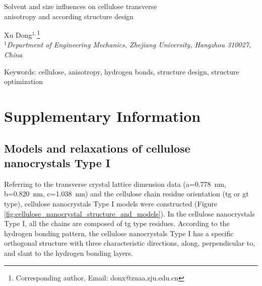 \documentclass{article}
\begin{document}
\begin{center}
\LARGE Solvent and size influences on cellulose transverse\\
anisotropy and according structure design\\
\end{center}

\begin{center}
\renewcommand{\thefootnote}{\fnsymbol{footnote}}
Xu Dong$^{1,}$\footnote{Corresponding author, Email: donx@zuaa.zju.edu.cn}\\
$^{1}$\textit{Department of Engineering Mechanics, Zhejiang University, Hangzhou 310027, China}
\end{center}

\begin{center}
Keywords: cellulose, anisotropy, hydrogen bonds, structure design, structure optimization
\end{center}





\setcounter{section}{0}
\setcounter{subsection}{0}

\setcounter{table}{0}
\setcounter{figure}{0}
\setcounter{equation}{0}

\renewcommand{\thesection}{S\arabic{section}}
\renewcommand{\thesubsection}{S\arabic{subsection}}

\renewcommand{\thetable}{S\arabic{table}}
\renewcommand{\thefigure}{S\arabic{figure}}
\renewcommand{\theequation}{S\arabic{equation}}





\section*{Supplementary Information}
\addtocounter{section}{1}
\setcounter{subsection}{0}
\indent

\subsection*{Models and relaxations of cellulose nanocrystals Type I}\indent
{}\indent

Referring to the transverse crystal lattice dimension data (a=0.778~nm, b=0.820~nm, c=1.038~nm) and the cellulose chain residue orientation (tg or gt type), cellulose nanocrystals Type I models were constructed (Figure \ref{fig:cellulose_nanocrystal_structure_and_models}).
In the cellulose nanocrystals Type I, all the chains are composed of tg type residues.
According to the hydrogen bonding pattern, the cellulose nanocrystals Type I has a specific orthogonal structure with three characteristic directions, along, perpendicular to, and slant to the hydrogen bonding layers.
\end{document}
